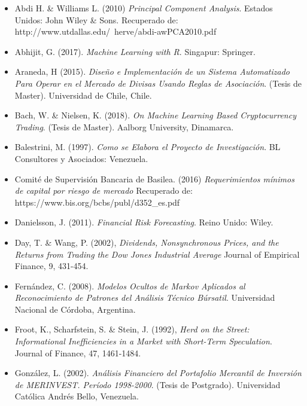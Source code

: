 \documentclass[a4paper,12pt]{Latex/Classes/PhDthesisPSnPDF}
\begin{document}
\begin{itemize}

\item Abdi H. \& Williams L. (2010) \textit{Principal Component Analysis}. Estados Unidos: John Wiley \& Sons. Recuperado de: http://www.utdallas.edu/~herve/abdi-awPCA2010.pdf

\item Abhijit, G. (2017). \textit{Machine Learning with R}. Singapur: Springer.

\item Araneda, H (2015). \textit{Diseño e Implementación de un Sistema Automatizado Para Operar en el Mercado de Divisas Usando Reglas de Asociación}. (Tesis de Master). Universidad de Chile, Chile.

\item Bach, W. \& Nielsen, K. (2018). \textit{On Machine Learning Based Cryptocurrency Trading}. (Tesis de Master). Aalborg University, Dinamarca.

\item Balestrini, M. (1997). \textit{Como se Elabora el Proyecto de Investigación}. BL Consultores y Asociados: Venezuela.

\item Comité de Supervisión Bancaria de Basilea. (2016) \textit{Requerimientos mínimos de capital por riesgo de mercado} Recuperado de: https://www.bis.org/bcbs/publ/d352\_es.pdf

\item Danielsson, J. (2011). \textit{Financial Risk Forecasting}. Reino Unido: Wiley.

\item Day, T. \& Wang, P. (2002), \textit{Dividends, Nonsynchronous Prices, and the Returns from Trading the Dow Jones Industrial Average} Journal of Empirical Finance, 9, 431-454.

\item Fernández, C. (2008). \textit{Modelos Ocultos de Markov Aplicados al Reconocimiento de Patrones del Análisis Técnico Búrsatil}. Universidad Nacional de Córdoba, Argentina.

\item Froot, K., Scharfstein, S. \& Stein, J. (1992), \textit{Herd on the Street: Informational Inefficiencies in a Market with Short-Term Speculation}. Journal of Finance, 47, 1461-1484.

\item González, L. (2002). \textit{Análisis Financiero del Portafolio Mercantil de Inversión de MERINVEST. Período 1998-2000}. (Tesis de Postgrado). Universidad Católica Andrés Bello, Venezuela.


\end{itemize}
\end{document}
